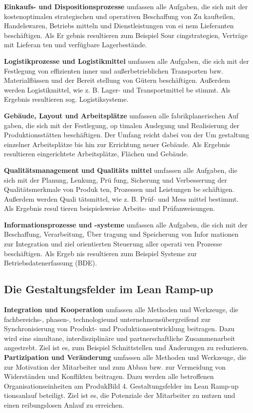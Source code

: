  \textbf{Einkaufs- und Dispositionsprozesse}
umfassen alle Aufgaben, die sich mit
der kostenoptimalen strategischen
und operativen Beschaffung von Zu
kaufteilen, Handelswaren, Betriebs
mitteln und Dienstleistungen von ei
nem Lieferanten beschäftigen. Als Er
gebnis resultieren zum Beispiel Sour
cingstrategien, Verträge mit Lieferan
ten und verfügbare Lagerbestände.


 \textbf{Logistikprozesse und Logistikmittel}
umfassen alle Aufgaben, die sich mit
der Festlegung von effizienten inner
und außerbetrieblichen Transporten
bzw. Materialflüssen und der Bereit
stellung von Gütern beschäftigen.
Außerdem werden Logistikmittel, wie
z. B. Lager- und Transportmittel be
stimmt. Als Ergebnis resultieren sog.
Logistiksysteme.

 \textbf{Gebäude, Layout und Arbeitsplätze}
umfassen alle fabrikplanerischen Auf
gaben, die sich mit der Festlegung, op
timalen Auslegung und Realisierung
der Produktionsstätten beschäftigen.
Der Umfang reicht dabei von der Um
gestaltung einzelner Arbeitsplätze bis
hin zur Errichtung neuer Gebäude.
Als Ergebnis resultieren eingerichtete
Arbeitsplätze, Flächen und Gebäude.


 \textbf{Qualitätsmanagement und Qualitäts
mittel} umfassen alle Aufgaben, die
sich mit der Planung, Lenkung, Prü
fung, Sicherung und Verbesserung
der Qualitätsmerkmale von Produk
ten, Prozessen und Leistungen be
schäftigen. Außerdem werden Quali
tätsmittel, wie z. B. Prüf- und Mess
mittel bestimmt. Als Ergebnis resul
tieren beispielsweise Arbeits- und
Prüfanweisungen.

\textbf{Informationsprozesse und -systeme}
umfassen alle Aufgaben, die sich mit
der Beschaffung, Verarbeitung, Über
tragung und Speicherung von Infor
mationen zur Integration und ziel
orientierten Steuerung aller operati
ven Prozesse beschäftigen. Als Ergeb
nis resultieren zum Beispiel Systeme
zur Betriebsdatenerfassung (BDE).


\subsection{Die Gestaltungsfelder im Lean Ramp-up}\label{appendix:dom11a:gf}
\textbf{Integration und Kooperation} umfassen
alle Methoden und Werkzeuge, die
fachbereichs-, phasen-, technologieund unternehmensübergreifend zur
Synchronisierung von Produkt- und
Produktionsentwicklung beitragen.
Dazu wird eine simultane, interdisziplinäre und partnerschaftliche Zusammenarbeit angestrebt. Ziel ist es,
zum Beispiel Schnittstellen und Änderungen zu reduzieren.
\textbf{Partizipation und Veränderung} umfassen alle Methoden und Werkzeuge,
die zur Motivation der Mitarbeiter
und zum Abbau bzw. zur Vermeidung
von Widerständen und Konflikten beitragen. Dazu werden alle betroffenen
Organisationseinheiten am ProdukBild 4. Gestaltungsfelder im Lean Ramp-up
tionsanlauf beteiligt. Ziel ist es, die
Potenziale der Mitarbeiter zu nutzen
und einen reibungslosen Anlauf zu erreichen.

